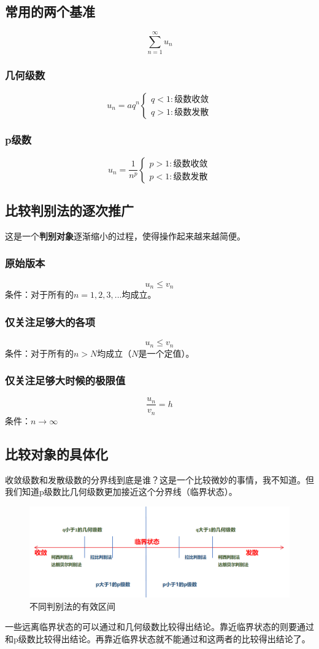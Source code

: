 \documentclass[UTF8]{ctexart}
\begin{document}
\subsection{常用的两个基准}
\[\sum_{n=1}^{\infty} u_n\]
\subsubsection{几何级数}
\[u_n=aq^n\begin{cases}
q<1:\text{级数收敛}\\
q>1:\text{级数发散}
\end{cases}\]

\subsubsection{p级数}
\[u_n = \frac{1}{n^p}\begin{cases}
p>1:\text{级数收敛}\\
p<1:\text{级数发散}
\end{cases}\]
\subsection{比较判别法的逐次推广}
这是一个\textbf{判别对象}逐渐缩小的过程，使得操作起来越来越简便。
\subsubsection{原始版本}
\[u_n\leq v_n\]
条件：对于所有的$n=1,2,3,...$均成立。
\subsubsection{仅关注足够大的各项}
\[u_n\leq v_n\]
条件：对于所有的$n>N$均成立（$N$是一个定值）。

\subsubsection{仅关注足够大时候的极限值}
\[\frac{u_n}{v_n}=h\]
条件：$n\to \infty$
\subsection{比较对象的具体化}
收敛级数和发散级数的分界线到底是谁？这是一个比较微妙的事情，我不知道。但我们知道p级数比几何级数更加接近这个分界线（临界状态）。
\begin{figure}
    \centering
    \includegraphics[width=1\linewidth]{收敛.png}
    \caption{不同判别法的有效区间}
    \label{敛散性}
\end{figure}
\par
一些远离临界状态的可以通过和几何级数比较得出结论。靠近临界状态的则要通过和p级数比较得出结论。再靠近临界状态就不能通过和这两者的比较得出结论了。
\end{document}
